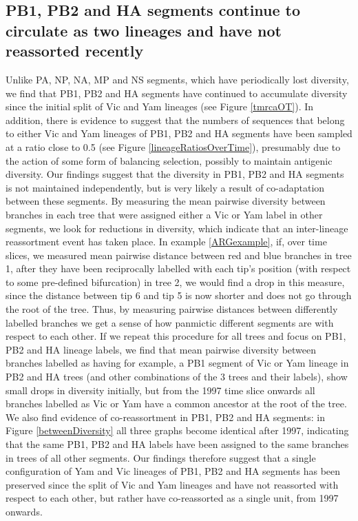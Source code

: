 \documentclass[11pt,oneside,letterpaper]{article}
\begin{document}
\subsection*{PB1, PB2 and HA segments continue to circulate as two lineages and have not reassorted recently}
Unlike PA, NP, NA, MP and NS segments, which have periodically lost diversity, we find that PB1, PB2 and HA segments have continued to accumulate diversity since the initial split of Vic and Yam lineages (see Figure \ref{tmrcaOT}).
In addition, there is evidence to suggest that the numbers of sequences that belong to either Vic and Yam lineages of PB1, PB2 and HA segments have been sampled at a ratio close to 0.5 (see Figure \ref{lineageRatiosOverTime}), presumably due to the action of some form of balancing selection, possibly to maintain antigenic diversity.
Our findings suggest that the diversity in PB1, PB2 and HA segments is not maintained independently, but is very likely a result of co-adaptation between these segments.
By measuring the mean pairwise diversity between branches in each tree that were assigned either a Vic or Yam label in other segments, we look for reductions in diversity, which indicate that an inter-lineage reassortment event has taken place.
In example \ref{ARGexample}, if, over time slices, we measured mean pairwise distance between red and blue branches in tree 1, after they have been reciprocally labelled with each tip's position (with respect to some pre-defined bifurcation) in tree 2, we would find a drop in this measure, since the distance between tip 6 and tip 5 is now shorter and does not go through the root of the tree.
Thus, by measuring pairwise distances between differently labelled branches we get a sense of how panmictic different segments are with respect to each other.
If we repeat this procedure for all trees and focus on PB1, PB2 and HA lineage labels, we find that mean pairwise diversity between branches labelled as having for example, a PB1 segment of Vic or Yam lineage in PB2 and HA trees (and other combinations of the 3 trees and their labels), show small drops in diversity initially, but from the 1997 time slice onwards all branches labelled as Vic or Yam have a common ancestor at the root of the tree.
We also find evidence of co-reassortment in PB1, PB2 and HA segments: in Figure \ref{betweenDiversity} all three graphs become identical after 1997, indicating that the same PB1, PB2 and HA labels have been assigned to the same branches in trees of all other segments.
Our findings therefore suggest that a single configuration of Yam and Vic lineages of PB1, PB2 and HA segments has been preserved since the split of Vic and Yam lineages and have not reassorted with respect to each other, but rather have co-reassorted as a single unit, from 1997 onwards.
\end{document}
